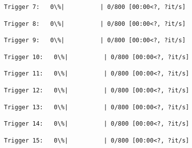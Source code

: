 \documentclass[11pt]{article}
\begin{document}
    \begin{Verbatim}[commandchars=\\\{\}]
Trigger 7:   0\%|          | 0/800 [00:00<?, ?it/s]
    \end{Verbatim}

    
    
    \begin{Verbatim}[commandchars=\\\{\}]
Trigger 8:   0\%|          | 0/800 [00:00<?, ?it/s]
    \end{Verbatim}

    
    
    \begin{Verbatim}[commandchars=\\\{\}]
Trigger 9:   0\%|          | 0/800 [00:00<?, ?it/s]
    \end{Verbatim}

    
    
    \begin{Verbatim}[commandchars=\\\{\}]
Trigger 10:   0\%|          | 0/800 [00:00<?, ?it/s]
    \end{Verbatim}

    
    
    \begin{Verbatim}[commandchars=\\\{\}]
Trigger 11:   0\%|          | 0/800 [00:00<?, ?it/s]
    \end{Verbatim}

    
    
    \begin{Verbatim}[commandchars=\\\{\}]
Trigger 12:   0\%|          | 0/800 [00:00<?, ?it/s]
    \end{Verbatim}

    
    
    \begin{Verbatim}[commandchars=\\\{\}]
Trigger 13:   0\%|          | 0/800 [00:00<?, ?it/s]
    \end{Verbatim}

    
    
    \begin{Verbatim}[commandchars=\\\{\}]
Trigger 14:   0\%|          | 0/800 [00:00<?, ?it/s]
    \end{Verbatim}

    
    
    \begin{Verbatim}[commandchars=\\\{\}]
Trigger 15:   0\%|          | 0/800 [00:00<?, ?it/s]
    \end{Verbatim}
\end{document}

